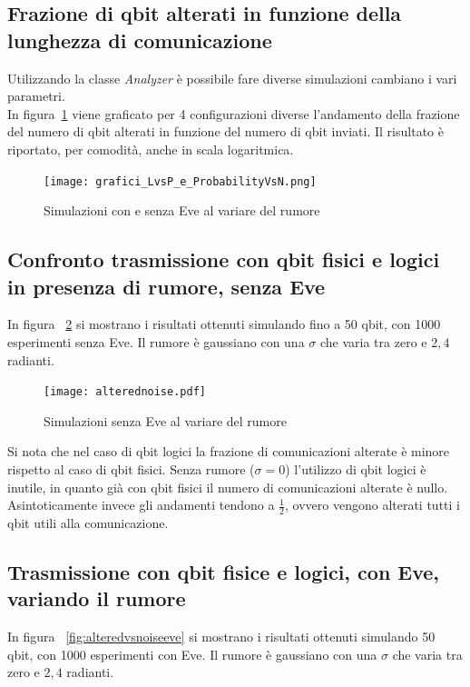 \documentclass[11 pt, a4paper]{article}
\begin{document}
\subsection{Frazione di qbit alterati in funzione della lunghezza di comunicazione}
Utilizzando la classe \textit{Analyzer} è possibile fare diverse simulazioni cambiano i vari parametri. \\In figura~\ref{fig:grafici_LvsP_e_ProbabilityVsN} viene graficato per 4 configurazioni diverse l'andamento della frazione del numero di qbit alterati in funzione del numero di qbit inviati. Il risultato è riportato, per comodità, anche in scala logaritmica.
\begin{figure}[htb!]
\centering
\texttt{[image: grafici\_LvsP\_e\_ProbabilityVsN.png]}
\caption{Simulazioni con e senza Eve al variare del rumore}
\label{fig:grafici_LvsP_e_ProbabilityVsN}
\end{figure}

\clearpage
\subsection{Confronto trasmissione con qbit fisici e logici in presenza di rumore, senza Eve}

In figura ~\ref{fig:alteredvsnoise} si mostrano i risultati ottenuti simulando fino a 50 qbit, con 1000 esperimenti senza Eve.
Il rumore è gaussiano con una $\sigma$ che varia tra zero e $2,4$ radianti.

\begin{figure}[htb!]
\centering
\texttt{[image: alterednoise.pdf]}
\caption{Simulazioni senza Eve al variare del rumore}
\label{fig:alteredvsnoise}
\end{figure}
Si nota che nel caso di qbit logici la frazione di comunicazioni alterate è minore rispetto al caso di qbit fisici.
Senza rumore ($\sigma=0$) l'utilizzo di qbit logici è inutile, in quanto già con qbit fisici il numero di comunicazioni alterate è nullo.
Asintoticamente invece gli andamenti tendono a $\frac{1}{2}$, ovvero vengono alterati tutti i qbit utili alla comunicazione.

\clearpage
\subsection{Trasmissione con qbit fisice e logici, con Eve, variando il rumore}
In figura ~\ref{fig:alteredvsnoiseeve} si mostrano i risultati ottenuti simulando 50 qbit, con 1000 esperimenti con Eve.
Il rumore è gaussiano con una $\sigma$ che varia tra zero e $2,4$ radianti.
\end{document}

